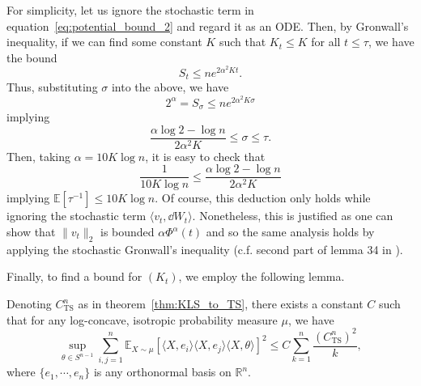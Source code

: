 For simplicity, let us ignore the stochastic term in 
equation~\eqref{eq:potential_bound_2} and regard it as an ODE. Then, by Gronwall's inequality, if we can 
find some constant \(K\) such that \(K_t \le K\) for all \(t \le \tau\), we have the bound
\[S_t \le n e^{2\alpha^2 K t}.\]
Thus, substituting \(\sigma\) into the above, we have 
\[2^\alpha = S_\sigma \le ne^{2\alpha^2 K\sigma}\]
implying 
\[\frac{\alpha \log 2 - \log n}{2\alpha^2 K} \le \sigma \le \tau.\]
Then, taking \(\alpha = 10K\log n\), it is easy to check that 
\[\frac{1}{10K \log n} \le \frac{\alpha \log 2 - \log n}{2\alpha^2 K}\]
implying \(\mathbb{E}[\tau^{-1}] \le 10K \log n\). Of course, this deduction only holds while ignoring the stochastic term 
\(\langle v_t, \dd W_t\rangle\). Nonetheless, this is justified as one can show that \(\|v_t\|_2\) is bounded 
\(\alpha \Phi^\alpha(t)\) and so the same analysis holds by applying the stochastic Gronwall's inequality
(c.f. second part of lemma 34 in \cite{Lee_2018}).

Finally, to find a bound for \((K_t)\), we employ the following lemma.

\begin{lemma}\label{lem:final_bd}
  Denoting \(C_{\text{TS}}^n\) as in theorem~\ref{thm:KLS_to_TS}, there exists a constant \(C\) such that 
  for any log-concave, isotropic probability measure \(\mu\), we have
  \[\sup_{\theta \in S^{n - 1}}\sum_{i, j = 1}^n 
    \mathbb{E}_{X \sim \mu}[\langle X, e_i\rangle \langle X, e_j\rangle \langle X, \theta\rangle]^2 \le 
    C \sum_{k = 1}^n \frac{(C_{\text{TS}}^n)^2}{k},\]
  where \(\{e_1, \cdots, e_n\}\) is any orthonormal basis on \(\mathbb{R}^n\).
\end{lemma}

